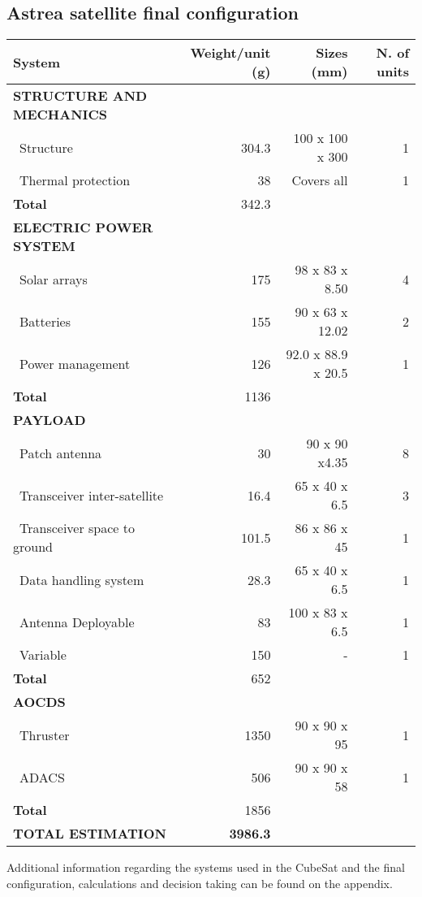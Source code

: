 \subsection{Astrea satellite final configuration}
\begin{longtable}{| l | r | r | r |}
	\hline
	\rowcolor[gray]{0.80}	\textbf{System}& \textbf{Weight/unit (g)} & \textbf{Sizes (mm)} & \textbf{N. of units}\\
	\hline
	\hline
	\endfirsthead
	
	
	\rowcolor[gray]{0.85} \textbf{STRUCTURE AND MECHANICS} & & & \\ \hline
	
	~Structure & 304.3 & 100 x 100 x 300& 1 \\
	~Thermal protection & 38 & Covers all & 1\\
	\hline 
	\rowcolor[gray]{0.95} \textbf{Total} & 342.3 & &  \\
	\hline 
	
	\rowcolor[gray]{0.85} \textbf{ELECTRIC POWER SYSTEM} & & & \\\hline
	
	~Solar arrays & 175 & 98 x 83 x 8.50 & 4 \\
	~Batteries & 155 & 90 x 63 x 12.02 & 2 \\
	~Power management & 126 & 92.0 x 88.9 x 20.5 & 1 \\
	\hline
	\rowcolor[gray]{0.95} \textbf{Total} & 1136 &  &  \\
	\hline \hline
	
	\rowcolor[gray]{0.85} \textbf{PAYLOAD} & & & \\ \hline
	
	~Patch antenna & 30 & 90 x 90 x4.35& 8 \\
	~Transceiver inter-satellite & 16.4 & 65 x 40 x 6.5 & 3 \\
	~Transceiver space to ground & 101.5 & 86 x 86 x 45 & 1 \\
	~Data handling system & 28.3 & 65 x 40 x 6.5 & 1\\
	~Antenna Deployable & 83 & 100 x 83 x 6.5 &1\\
	~Variable & 150 & - & 1\\
	\hline
	\rowcolor[gray]{0.95} \textbf{Total} & 652 &  & \\
	\hline \hline
	
	\rowcolor[gray]{0.85} \textbf{AOCDS} & & &\\ \hline
	
	~Thruster & 1350 & 90 x 90 x 95 & 1 \\
	~ADACS & 506 & 90 x 90 x 58 & 1 \\
	\hline
	\rowcolor[gray]{0.95} \textbf{Total} & 1856 &  & \\
	\hline
	
	\rowcolor[gray]{0.9} \textbf{TOTAL ESTIMATION} & \textbf{3986.3} & & \\ \hline
\end{longtable} 

Additional information regarding the systems used in the CubeSat and the final configuration, calculations and decision taking can be found on the appendix.